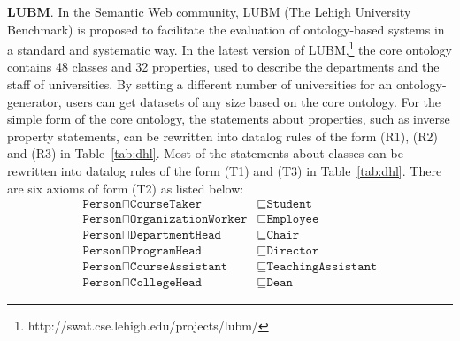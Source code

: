 \textbf{LUBM}. In the Semantic Web community, LUBM
(The Lehigh University Benchmark) is proposed to
facilitate the evaluation of ontology-based systems
in a standard and systematic way.
In the latest version of LUBM,\footnote{http://swat.cse.lehigh.edu/projects/lubm/}
the core ontology contains 48 classes and 32 properties, used to describe the departments and the staff of
universities. By setting a different number of universities for an ontology-generator, users can get datasets of any size based on the core ontology.
%
For the simple form of the core ontology,
the statements about properties, such as inverse property statements,
can be rewritten into datalog rules of the form (R1), (R2) and (R3) in Table~\ref{tab:dhl}.
Most of the statements about classes can be rewritten into datalog rules of the form (T1) and (T3)
in Table~\ref{tab:dhl}. There are six axioms of form (T2) as listed below:
\begin{align}
\texttt{Person}\sqcap\texttt{CourseTaker} & \sqsubseteq\texttt{Student}\label{lubm:a1}\tag{$\alpha_1$}\\
\texttt{Person}\sqcap\texttt{OrganizationWorker} & \sqsubseteq\texttt{Employee}\label{lubm:a2}\tag{$\alpha_2$}\\
\texttt{Person}\sqcap\texttt{DepartmentHead} & \sqsubseteq\texttt{Chair}\label{lubm:a3}\tag{$\alpha_3$}\\
\texttt{Person}\sqcap\texttt{ProgramHead} & \sqsubseteq\texttt{Director}\label{lubm:a4}\tag{$\alpha_4$}\\
\texttt{Person}\sqcap\texttt{CourseAssistant} & \sqsubseteq\texttt{TeachingAssistant}\label{lubm:a5}\tag{$\alpha_5$}\\
\texttt{Person}\sqcap\texttt{CollegeHead} & \sqsubseteq\texttt{Dean}\label{lubm:a6}\tag{$\alpha_6$}
\end{align}
